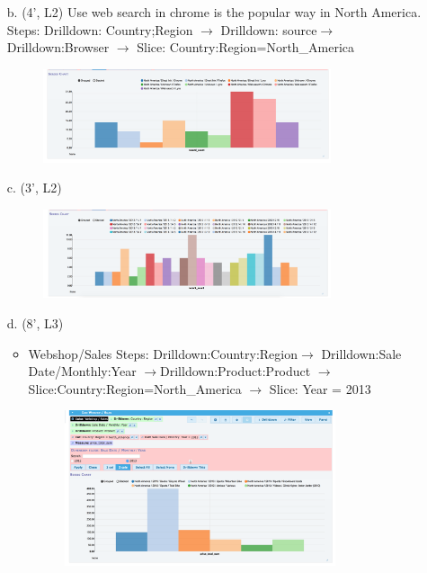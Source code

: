 \begin{enumerate}
\item[b.](4', L2)
Use web search in chrome is the popular way in North America.\\
Steps: Drilldown: Country;Region $\rightarrow$ 
Drilldown: source$\rightarrow$ 
Drilldown:Browser $\rightarrow$
 Slice: Country:Region={North\_America}\\
\begin{figure}[H]
\includegraphics[width=0.8\textwidth]{Figures/5b.png}
\centering
\end{figure}

\item[c.](3', L2) 
\begin{figure}[H]
\includegraphics[width=0.8\textwidth]{Figures/5c1.png}
\centering
\end{figure}

\item[d.](8', L3)
\begin{itemize}
\item Webshop/Sales
Steps: Drilldown:Country:Region$\rightarrow$
Drilldown:Sale Date/Monthly:Year
$\rightarrow$Drilldown:Product:Product 
$\rightarrow$Slice:Country:Region={North\_America} 
$\rightarrow$ Slice: Year = 2013

\begin{figure}[H]
\includegraphics[width=0.8\textwidth]{Figures/d1.png}
\centering
\end{figure}


\end{itemize}
\end{enumerate}
